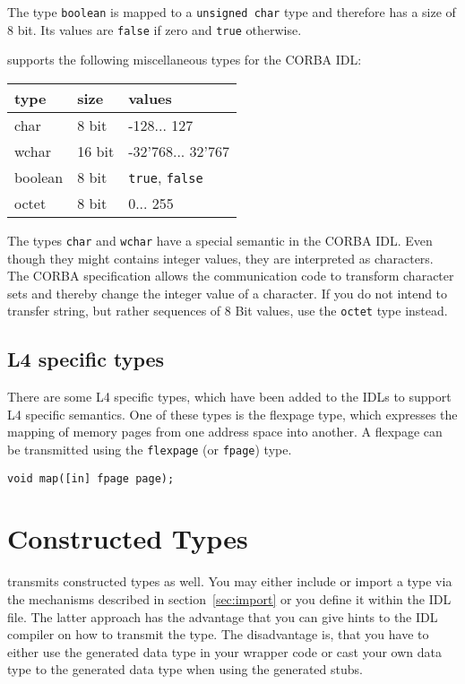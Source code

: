 The type {\tt boolean} is mapped to a {\tt unsigned char} type and
therefore has a size of 8 bit. Its values are {\tt false} if zero
and {\tt true} otherwise.

\dice{} supports the following miscellaneous types for the
CORBA IDL:

\begin{center}
\begin{tabular}{|l|l|l|}
\hline
type & size & values \\
\hline
char & 8 bit & -128... 127 \\
wchar & 16 bit & -32'768... 32'767 \\
boolean & 8 bit & {\tt true}, {\tt false} \\
octet & 8 bit & 0... 255 \\
\hline
\end{tabular}
\end{center}

The types {\tt char} and {\tt wchar} have a special semantic in the
CORBA IDL. Even though they might contains integer values, they are
interpreted as characters. The CORBA specification allows the communication
code to transform character sets and thereby change the integer value of
a character. If you do not intend to transfer string, but rather sequences
of 8 Bit values, use the {\tt octet} type instead.

\subsection{L4 specific types}
There are some L4 specific types, which have been added to the
IDLs to support L4 specific semantics.
One of these types is the flexpage type, which expresses the
mapping of memory pages from one address space into another.
A flexpage can be transmitted using the {\tt flexpage} (or {\tt fpage})
type.

\begin{verbatim}
void map([in] fpage page);
\end{verbatim}

\section{Constructed Types}

\dice{} transmits constructed types as well. You may either include
or import a type via the mechanisms described in section~\ref{sec:import}
or you define it within the IDL file. The latter approach has the
advantage that you can give hints to the IDL compiler on how to
transmit the type. The disadvantage is, that you have to either
use the generated data type in your wrapper code or cast your own 
data type to the generated data type when using the generated stubs.

